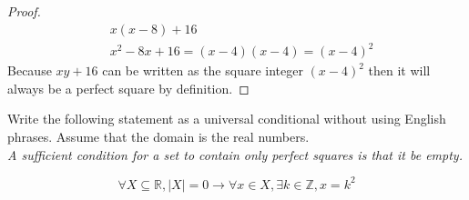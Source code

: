\documentclass[12pt,letterpaper, onecolumn]{exam}
\begin{document}
\begin{questions}
\begin{solution}
\begin{proof}
	 	\begin{align}
	 			&x(x-8)+16\\
	 		&x^2-8x+16=(x-4)(x-4)=(x-4)^2
	 	\end{align}
	 	Because $xy+16$ can be written as the square integer $(x-4)^2$ then it will always be a perfect square by definition. 
	 	\end{proof}
	 \end{solution}
	 \question Write the following statement as a universal conditional without using English phrases. Assume that the domain is the real numbers.\\
	 \textit{A sufficient condition for a set to contain only perfect squares is that it be empty.}
	 \begin{solution}
	 	$$\forall X \subseteq \mathbb{R}, |X|=0 \longrightarrow \forall x \in X, \exists k \in \mathbb{Z}, x=k^2 $$
	 \end{solution}
	\end{questions}
\end{document}
